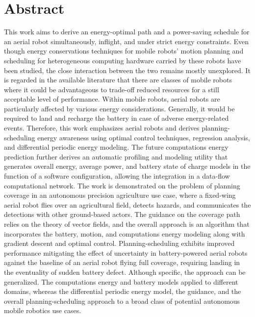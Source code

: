 
%
%
\chapter*{Abstract}

This work aims to derive an energy-optimal path and a power-saving schedule for an aerial robot simultaneously, inflight, and under strict energy constraints. Even though energy conservations techniques for mobile robots' motion planning and scheduling for heterogeneous computing hardware carried by these robots have been studied, the close interaction between the two remains mostly unexplored. It is regarded in the available literature that there are classes of mobile robots where it could be advantageous to trade-off reduced resources for a still acceptable level of performance. Within mobile robots, aerial robots are particularly affected by various energy considerations. Generally, it would be required to land and recharge the battery in case of adverse energy-related events. Therefore, this work emphasizes aerial robots and derives planning-scheduling energy awareness using optimal control techniques, regression analysis, and differential periodic energy modeling. The future computations energy prediction further derives an automatic profiling and modeling utility that generates overall energy, average power, and battery state of charge models in the function of a software configuration, allowing the integration in a data-flow computational network. The work is demonstrated on the problem of planning coverage in an autonomous precision agriculture use case, where a fixed-wing aerial robot flies over an agricultural field, detects hazards, and communicates the detections with other ground-based actors. The guidance on the coverage path relies on the theory of vector fields, and the overall approach is an algorithm that incorporates the battery, motion, and computations energy modeling along with gradient descent and optimal control. Planning-scheduling exhibits improved performance mitigating the effect of uncertainty in battery-powered aerial robots against the baseline of an aerial robot flying full coverage, requiring landing in the eventuality of sudden battery defect. Although specific, the approach can be generalized. The computations energy and battery models applied to different domains, whereas the differential periodic energy model, the guidance, and the overall planning-scheduling approach to a broad class of potential autonomous mobile robotics use cases.


\cleardoublepage   %


